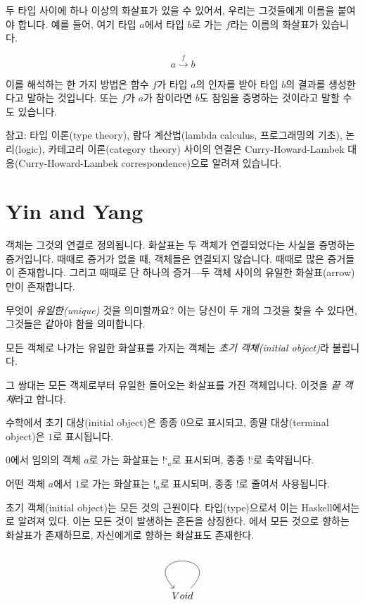 \documentclass[DaoFP]{subfiles}
\begin{document}
두 타입 사이에 하나 이상의 화살표가 있을 수 있어서, 우리는 그것들에게 이름을 붙여야 합니다. 예를 들어, 여기 타입 $a$에서 타입 $b$로 가는 $f$라는 이름의 화살표가 있습니다.

\[ a \xrightarrow f b \]

이를 해석하는 한 가지 방법은 함수 $f$가 타입 $a$의 인자를 받아 타입 $b$의 결과를 생성한다고 말하는 것입니다. 또는 $f$가 $a$가 참이라면 $b$도 참임을 증명하는 것이라고 말할 수도 있습니다.

참고: 타입 이론(type theory), 람다 계산법(lambda calculus, 프로그래밍의 기초), 논리(logic), 카테고리 이론(category theory) 사이의 연결은 Curry-Howard-Lambek 대응(Curry-Howard-Lambek correspondence)으로 알려져 있습니다.

\section{Yin and Yang}

객체는 그것의 연결로 정의됩니다. 화살표는 두 객체가 연결되었다는 사실을 증명하는 증거입니다. 때때로 증거가 없을 때, 객체들은 연결되지 않습니다. 때때로 많은 증거들이 존재합니다. 그리고 때때로 단 하나의 증거---두 객체 사이의 유일한 화살표(arrow)만이 존재합니다.

무엇이 \emph{유일한(unique)} 것을 의미할까요? 이는 당신이 두 개의 그것을 찾을 수 있다면, 그것들은 같아야 함을 의미합니다.

모든 객체로 나가는 유일한 화살표를 가지는 객체는 \emph{초기 객체(initial object)}라 불립니다.

그 쌍대는 모든 객체로부터 유일한 들어오는 화살표를 가진 객체입니다. 이것을 \emph{끝 객체}라고 합니다.

수학에서 초기 대상(initial object)은 종종 $0$으로 표시되고, 종말 대상(terminal object)은 $1$로 표시됩니다.

$0$에서 임의의 객체 $a$로 가는 화살표는 $\mbox{!`}_a$로 표시되며, 종종 $\mbox{!`}$로 축약됩니다.

어떤 객체 $a$에서 $1$로 가는 화살표는 $!_a$로 표시되며, 종종 $!$로 줄여서 사용됩니다.

초기 객체(initial object)는 모든 것의 근원이다. 타입(type)으로서 이는 Haskell에서는 로 알려져 있다. 이는 모든 것이 발생하는 혼돈을 상징한다. 에서 모든 것으로 향하는 화살표가 존재하므로,  자신에게로 향하는 화살표도 존재한다.

\[
 \begin{tikzcd}
 Void
 \arrow[loop]
 \end{tikzcd}
\]
\end{document}

